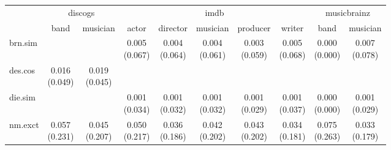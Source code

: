 \documentclass[epsfig,a4paper,11pt,titlepage,twoside,openany]{book}
\begin{document}
\begin{table}[h]
\centering
\begin{tabular}{l|c|c|c|c|c|c|c|c|c|}
\cline{2-10}
                                                           & \multicolumn{2}{c|}{discogs} & \multicolumn{5}{c|}{imdb}                                                & \multicolumn{2}{c|}{musicbrainz} \\ \cline{2-10} 
                                                           & band          & musician     & actor        & director     & musician     & producer     & writer       & band            & musician       \\ \hline
\multicolumn{1}{|l|}{brn.sim}                        &               &              & \makecell{0.005 \\ (0.067)} & \makecell{0.004 \\ (0.064)} & \makecell{0.004 \\ (0.061)} & \makecell{0.003 \\ (0.059)} & \makecell{0.005 \\ (0.068)} & \makecell{0.000 \\ (0.000)}    & \makecell{0.007 \\ (0.078)}   \\ \hline
\multicolumn{1}{|l|}{des.cos}                  & \makecell{0.016 \\ (0.049)}  & \makecell{0.019 \\ (0.045)} &              &              &              &              &              &                 &                \\ \hline
\multicolumn{1}{|l|}{die.sim}                        &               &              & \makecell{0.001 \\ (0.034)} & \makecell{0.001 \\ (0.032)} & \makecell{0.001 \\ (0.032)} & \makecell{0.001 \\ (0.029)} & \makecell{0.001 \\ (0.037)} & \makecell{0.000 \\ (0.000)}    & \makecell{0.001 \\ (0.029)}   \\ \hline
\multicolumn{1}{|l|}{nm.exct}                          & \makecell{0.057 \\ (0.231)}  & \makecell{0.045 \\ (0.207)} & \makecell{0.050 \\ (0.217)} & \makecell{0.036 \\ (0.186)} & \makecell{0.042 \\ (0.202)} & \makecell{0.043 \\ (0.202)} & \makecell{0.034 \\ (0.181)} & \makecell{0.075 \\ (0.263)}    & \makecell{0.033 \\ (0.179)}   \\ \hline

\end{tabular}
\end{table}
\end{document}
